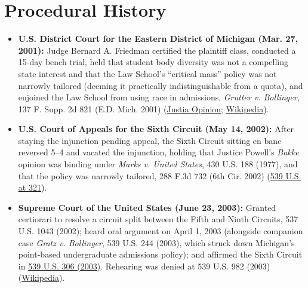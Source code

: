\documentclass[12pt]{article}
\begin{document}
\section{Procedural History}
\begin{itemize}
    \item \textbf{U.S. District Court for the Eastern District of Michigan (Mar. 27, 2001):} Judge Bernard A. Friedman certified the plaintiff class, conducted a 15-day bench trial, held that student body diversity was not a compelling state interest and that the Law School's ``critical mass'' policy was not narrowly tailored (deeming it practically indistinguishable from a quota), and enjoined the Law School from using race in admissions, \textit{Grutter v. Bollinger}, 137 F. Supp. 2d 821 (E.D. Mich. 2001) (\href{https://supreme.justia.com/cases/federal/us/539/306/}{Justia Opinion}; \href{https://en.wikipedia.org/wiki/Grutter_v._Bollinger}{Wikipedia}).
    \item \textbf{U.S. Court of Appeals for the Sixth Circuit (May 14, 2002):} After staying the injunction pending appeal, the Sixth Circuit sitting en banc reversed 5--4 and vacated the injunction, holding that Justice Powell's \textit{Bakke} opinion was binding under \textit{Marks v. United States}, 430 U.S. 188 (1977), and that the policy was narrowly tailored, 288 F.3d 732 (6th Cir. 2002) (\href{https://supreme.justia.com/cases/federal/us/539/306/}{539 U.S. at 321}).
    \item \textbf{Supreme Court of the United States (June 23, 2003):} Granted certiorari to resolve a circuit split between the Fifth and Ninth Circuits, 537 U.S. 1043 (2002); heard oral argument on April 1, 2003 (alongside companion case \textit{Gratz v. Bollinger}, 539 U.S. 244 (2003), which struck down Michigan's point-based undergraduate admissions policy); and affirmed the Sixth Circuit in \href{https://www.courtlistener.com/opinion/130155/grutter-v-bollinger/}{539 U.S. 306 (2003)}. Rehearing was denied at 539 U.S. 982 (2003) (\href{https://en.wikipedia.org/wiki/Grutter_v._Bollinger}{Wikipedia}).
\end{itemize}
\end{document}
